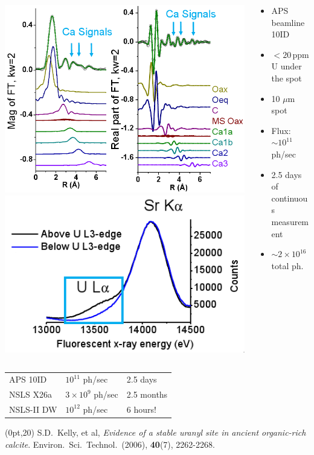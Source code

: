 \documentclass[10pt, xcolor=x11names, compress]{beamer}
\begin{document}
\begin{frame}
\begin{columns}
\begin{column}{0.6\linewidth}
      \includegraphics[width=0.6\linewidth]{pses/Uexafs.png}
      \includegraphics[width=0.4\linewidth]{pses/Ufluo.png}
    \end{column}
    \begin{column}{0.4\linewidth}
      \small
      \begin{itemize}
      \item APS beamline 10ID
      \item $<20$\,ppm U under the spot
      \item 10 $\mu$m spot
      \item Flux: $\sim10^{11}$ ph/sec
      \item 2.5 days of continuous measurement
      \item $\sim2\times10^{16}$ total ph.
      \end{itemize}
    \end{column}
  \end{columns}
  \begin{center}
    \begin{tabular}{lll}
      APS 10ID  & $10^{11}$ ph/sec     & 2.5 days\\
      NSLS X26a & $3\times10^9$ ph/sec & 2.5 months\\
      \alert{NSLS-II DW} & \alert{$10^{12}$ ph/sec} & \alert{6 hours!}
    \end{tabular}
  \end{center}
  \begin{textblock*}{0.6\linewidth}(0pt,20\TPVertModule) 
    \tiny
    S.D.\ Kelly, et al, \textit{Evidence of a stable uranyl site in ancient
    organic-rich calcite}. Environ.\ Sci.\ Technol.\ (2006), \textbf{40}(7),
    2262-2268. 
  \end{textblock*}
\end{frame}
\end{document}
